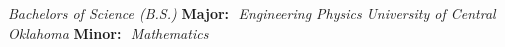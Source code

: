 %
%
%
\vspace*{-.5cm}
\textbf{}
\begin{scholarship}
			{\emph{Bachelors of Science (B.S.)} \hspace{4cm} \textbf{Major:}\,\, \emph{Engineering Physics} }
		{\emph{University of Central Oklahoma}\hspace{3.45cm}
		\textbf{Minor:}\,\, \emph{Mathematics}}
\end{scholarship}